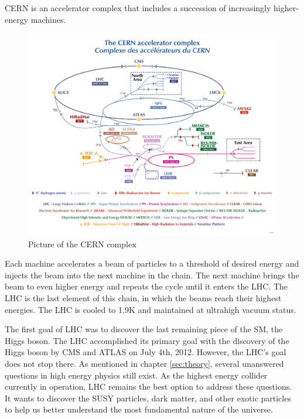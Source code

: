 CERN is an accelerator complex that includes a succession of increasingly higher-energy machines.
\begin{figure}[h!]
	\caption{Picture of the CERN complex \cite{CERN}}
  \label{fig:CERN}
  \centering
  \includegraphics[width=1.0\linewidth]{figs/LHC.png}
\end{figure}
Each machine accelerates a beam of particles to a threshold of desired energy and injects the beam into the next machine in the chain.
The next machine brings the beam to even higher energy and repeats the cycle until it enters the LHC.
The LHC is the last element of this chain, in which the beams reach their highest energies.
The LHC is cooled to 1.9K and maintained at ultrahigh vacuum status.

The first goal of LHC was to discover the last remaining piece of the SM, the Higgs boson.
The LHC accomplished its primary goal with the discovery of the Higgs boson by CMS and ATLAS on July 4th, 2012.
However, the LHC's goal does not stop there.
As mentioned in chapter \ref{sec:theory}, several unanswered questions in high energy physics still exist.
As the highest energy collider currently in operation, LHC remains the best option to address these questions. 
It wants to discover the SUSY particles, dark matter, and other exotic particles to help us better understand the most fundamental nature of the universe.

